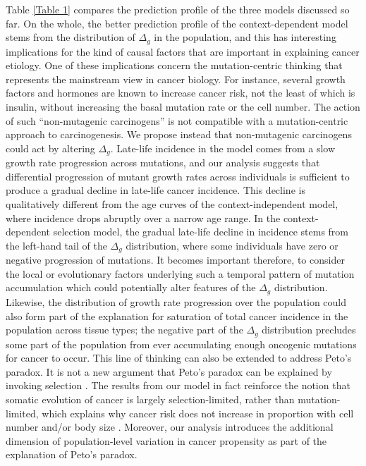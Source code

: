 \documentclass[12pt,onecolumn,twoside]{article}
\begin{document}
Table \ref{Table 1} compares the prediction profile of the three models discussed so far. On the whole, the better prediction profile of the context-dependent model stems from the distribution of $\Delta_{g}$ in the population, and this has interesting implications for the kind of causal factors that are important in explaining cancer etiology. One of these implications concern the mutation-centric thinking that represents the mainstream view in cancer biology. For instance, several growth factors and hormones are known to increase cancer risk, not the least of which is insulin, without increasing the basal mutation rate or the cell number. The action of such ``non-mutagenic carcinogens'' is not compatible with a mutation-centric approach to carcinogenesis. We propose instead that non-mutagenic carcinogens could act by altering $\Delta_{g}$.
Late-life incidence in the model comes from a slow growth rate progression across mutations, and our analysis suggests that differential progression of mutant growth rates across individuals is sufficient to produce a gradual decline in late-life cancer incidence. This decline is qualitatively different from the age curves of the context-independent model, where incidence drops abruptly over a narrow age range. In the context-dependent selection model, the gradual late-life decline in incidence stems from the left-hand tail of the $\Delta_{g}$ distribution, where some individuals have zero or negative progression of mutations. It becomes important therefore, to consider the local or evolutionary factors underlying such a temporal pattern of mutation accumulation which could potentially alter features of the $\Delta_{g}$ distribution. Likewise, the distribution of growth rate progression over the population could also form part of the explanation for saturation of total cancer incidence in the population across tissue types; the negative part of the $\Delta_{g}$ distribution precludes some part of the population from ever accumulating enough oncogenic mutations for cancer to occur.
This line of thinking can also be extended to address Peto's paradox. It is not a new argument that Peto's paradox can be explained by invoking selection \autocite{Caulin2011,Noble2015,Tollis2017b}. The results from our model in fact reinforce the notion that somatic evolution of cancer is largely selection-limited, rather than mutation-limited, which explains why cancer risk does not increase in proportion with cell number and/or body size \autocite{Nagy2007}. Moreover, our analysis introduces the additional dimension of population-level variation in cancer propensity as part of the explanation of Peto's paradox.
\end{document}
